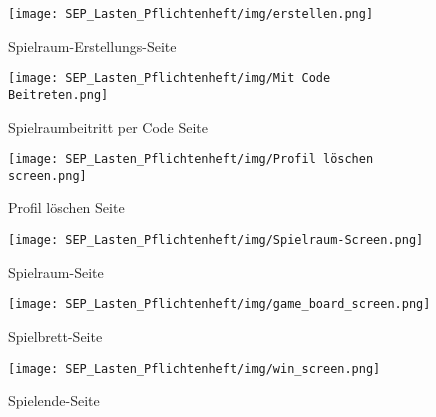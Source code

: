 \begin{figure}[!h]
	\centering
	\texttt{[image: SEP\_Lasten\_Pflichtenheft/img/erstellen.png]}
	\caption{Spielraum-Erstellungs-Seite}
	\label{gui:create_gameroom}
\end{figure}

\begin{figure}[!h]
	\centering
	\texttt{[image: SEP\_Lasten\_Pflichtenheft/img/Mit Code Beitreten.png]}
	\caption{Spielraumbeitritt per Code Seite}
	\label{gui:join_code}
\end{figure}

\begin{figure}[!h]
	\centering
	\texttt{[image: SEP\_Lasten\_Pflichtenheft/img/Profil löschen screen.png]}
	\caption{Profil löschen Seite}
	\label{gui:delete_prof}
\end{figure}

\begin{figure}[!h]
	\centering
	\texttt{[image: SEP\_Lasten\_Pflichtenheft/img/Spielraum-Screen.png]}
	\caption{Spielraum-Seite}
	\label{gui:gameroom}
\end{figure}

\begin{figure}[!h]
	\centering
	\texttt{[image: SEP\_Lasten\_Pflichtenheft/img/game\_board\_screen.png]}
	\caption{Spielbrett-Seite}
	\label{gui:gameboard}
\end{figure}

\begin{figure}[!h]
	\centering
	\texttt{[image: SEP\_Lasten\_Pflichtenheft/img/win\_screen.png]}
	\caption{Spielende-Seite}
	\label{gui:win}
\end{figure}